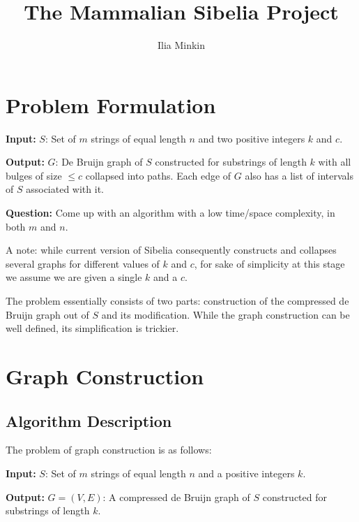 \documentclass[a4paper, 12pt]{scrartcl}
\title{The Mammalian Sibelia Project}
\author{Ilia Minkin}
\date{}
\begin{document}
\maketitle
{}
\renewcommand{\algorithmicrequire}{\textbf{Input: }}
\renewcommand{\algorithmicensure}{\textbf{Output: }}

\section{Problem Formulation}
\textbf{Input:} $S$: Set of $m$ strings of equal length $n$ and two positive integers $k$ and $c$.

\textbf{Output:} $G$: De Bruijn graph of $S$ constructed for substrings of length $k$ with all bulges of size $\leq c$ collapsed into paths.
Each edge of $G$ also has a list of intervals of $S$ associated with it.

\textbf{Question:} Come up with an algorithm with a low time/space complexity, in both $m$ and $n$. 

A note: while current version of Sibelia consequently constructs and collapses several graphs for different values of $k$ and $c$, for sake of simplicity at this stage we assume we are given a single $k$ and a $c$.

The problem essentially consists of two parts: construction of the compressed de Bruijn graph out of $S$ and its modification.
While the graph construction can be well defined, its simplification is trickier.

\section{Graph Construction}

\subsection{Algorithm Description}
The problem of graph construction is as follows:

\textbf{Input:} $S$: Set of $m$ strings of equal length $n$ and a positive integers $k$.

\textbf{Output:} $G = (V, E)$: A compressed de Bruijn graph of $S$ constructed for substrings of length $k$.
\end{document}
